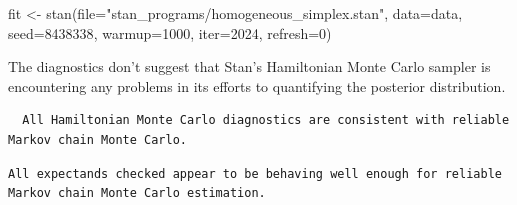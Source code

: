 \documentclass[
  letterpaper,
  DIV=11,
  numbers=noendperiod]{scrartcl}
\newenvironment{Shaded}{\begin{snugshade}}{\end{snugshade}}
\newcommand{\AttributeTok}[1]{\textcolor[rgb]{0.40,0.45,0.13}{#1}}
\newcommand{\ConstantTok}[1]{\textcolor[rgb]{0.56,0.35,0.01}{#1}}
\newcommand{\DecValTok}[1]{\textcolor[rgb]{0.68,0.00,0.00}{#1}}
\newcommand{\FunctionTok}[1]{\textcolor[rgb]{0.28,0.35,0.67}{#1}}
\newcommand{\NormalTok}[1]{\textcolor[rgb]{0.00,0.23,0.31}{#1}}
\newcommand{\OtherTok}[1]{\textcolor[rgb]{0.00,0.23,0.31}{#1}}
\newcommand{\SpecialCharTok}[1]{\textcolor[rgb]{0.37,0.37,0.37}{#1}}
\newcommand{\StringTok}[1]{\textcolor[rgb]{0.13,0.47,0.30}{#1}}
\begin{document}
\begin{Shaded}
\begin{Highlighting}[]
\NormalTok{fit }\OtherTok{\textless{}{-}} \FunctionTok{stan}\NormalTok{(}\AttributeTok{file=}\StringTok{"stan\_programs/homogeneous\_simplex.stan"}\NormalTok{,}
            \AttributeTok{data=}\NormalTok{data, }\AttributeTok{seed=}\DecValTok{8438338}\NormalTok{,}
            \AttributeTok{warmup=}\DecValTok{1000}\NormalTok{, }\AttributeTok{iter=}\DecValTok{2024}\NormalTok{, }\AttributeTok{refresh=}\DecValTok{0}\NormalTok{)}
\end{Highlighting}
\end{Shaded}

The diagnostics don't suggest that Stan's Hamiltonian Monte Carlo
sampler is encountering any problems in its efforts to quantifying the
posterior distribution.

\begin{Shaded}
\end{Shaded}

\begin{verbatim}
  All Hamiltonian Monte Carlo diagnostics are consistent with reliable
Markov chain Monte Carlo.
\end{verbatim}

\begin{Shaded}
\end{Shaded}

\begin{verbatim}
All expectands checked appear to be behaving well enough for reliable
Markov chain Monte Carlo estimation.
\end{verbatim}
\end{document}
